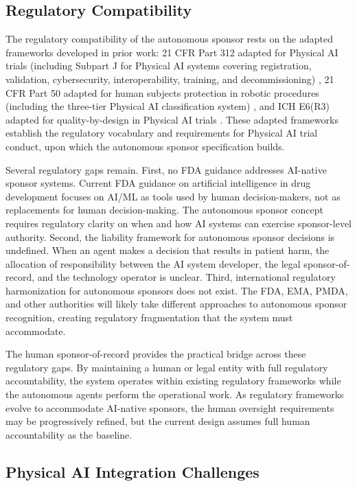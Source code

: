 \subsection{Regulatory Compatibility}

The regulatory compatibility of the autonomous sponsor rests on the adapted frameworks
developed in prior work: 21 CFR Part 312 adapted for Physical AI trials (including Subpart J
for Physical AI systems covering registration, validation, cybersecurity, interoperability,
training, and decommissioning) \cite{cfr312-adapt}, 21 CFR Part 50 adapted for human
subjects protection in robotic procedures (including the three-tier Physical AI
classification system) \cite{cfr50-adapt}, and ICH E6(R3) adapted for quality-by-design in
Physical AI trials \cite{ich-adapt}. These adapted frameworks establish the regulatory
vocabulary and requirements for Physical AI trial conduct, upon which the autonomous sponsor
specification builds.

Several regulatory gaps remain. First, no FDA guidance addresses AI-native sponsor systems.
Current FDA guidance on artificial intelligence in drug development focuses on AI/ML as
tools used by human decision-makers, not as replacements for human decision-making. The
autonomous sponsor concept requires regulatory clarity on when and how AI systems can
exercise sponsor-level authority. Second, the liability framework for autonomous sponsor
decisions is undefined. When an agent makes a decision that results in patient harm, the
allocation of responsibility between the AI system developer, the legal sponsor-of-record,
and the technology operator is unclear. Third, international regulatory harmonization for
autonomous sponsors does not exist. The FDA, EMA, PMDA, and other authorities will likely
take different approaches to autonomous sponsor recognition, creating regulatory
fragmentation that the system must accommodate.

The human sponsor-of-record provides the practical bridge across these regulatory gaps.
By maintaining a human or legal entity with full regulatory accountability, the system
operates within existing regulatory frameworks while the autonomous agents perform the
operational work. As regulatory frameworks evolve to accommodate AI-native sponsors, the
human oversight requirements may be progressively refined, but the current design assumes
full human accountability as the baseline.

\subsection{Physical AI Integration Challenges}

